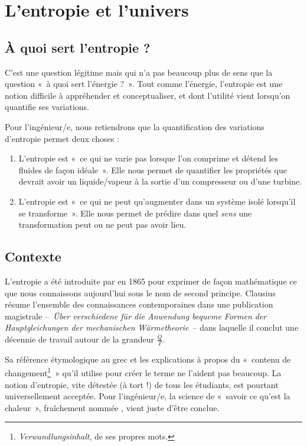 \section{L’entropie et l’univers}

	\subsection{À quoi sert l’entropie ?}

		C’est une question légitime mais qui n’a pas beaucoup plus de sens que la question «~à quoi sert l’énergie ?~». Tout comme l’énergie, l’entropie est une notion difficile à appréhender et conceptualiser, et dont l’utilité vient lorsqu’on quantifie ses variations.
		
		Pour l’ingénieur/e, nous retiendrons que la quantification des variations d’entropie permet deux choses :
		\begin{enumerate}
			\item L’entropie est «~ce qui ne varie pas lorsque l’on comprime et détend les fluides de façon idéale~». Elle nous permet de quantifier les propriétés que devrait avoir un liquide/vapeur à la sortie d’un compresseur ou d’une turbine.
			\item L’entropie est «~ce qui ne peut qu’augmenter dans un système isolé lorsqu’il se transforme~». Elle nous permet de prédire dans quel \emph{sens} une transformation peut ou ne peut pas avoir lieu.
		\end{enumerate}

	\subsection{Contexte}
	
		L’entropie a été introduite par  en 1865 pour exprimer de façon mathématique ce que nous connaissons aujourd’hui sous le nom de second principe. Clausius résume l’ensemble des connaissances contemporaines dans une publication magistrale --\ \textit{Über verschiedene für die Anwendung bequeme Formen der Hauptgleichungen der mechanischen Wärmetheorie}\ -- dans laquelle il conclut une décennie de travail autour de la grandeur $\frac{Q}{T}$.
		
		Sa référence étymologique au grec et les explications à propos du «~contenu de changement\footnote{\textit{Verwandlungsinhalt}, de ses propres mots.}~» qu’il utilise pour créer le terme  ne l’aident pas beaucoup. La notion d’entropie, vite détestée (à tort !) de tous les étudiants, est pourtant universellement acceptée. Pour l’ingénieur/e, la science de «~savoir ce qu’est la chaleur~», fraîchement nommée , vient juste d’être conclue.
		
